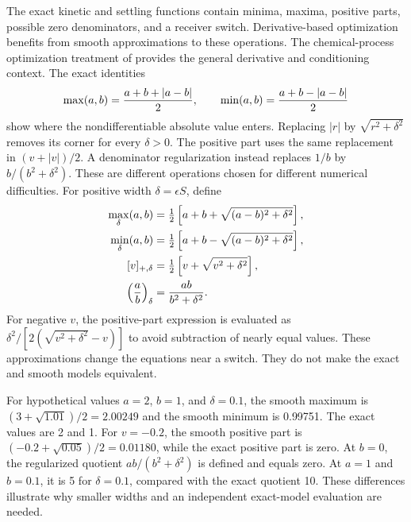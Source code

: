 The exact kinetic and settling functions contain minima, maxima, positive parts, possible zero denominators, and a receiver switch. Derivative-based optimization benefits from smooth approximations to these operations. The chemical-process optimization treatment of \citet{BuzziFerraris2013} provides the general derivative and conditioning context. The exact identities
\begin{equation}
\equationname{Exact maximum and minimum expressed through absolute values}
\max(a,b)=\frac{a+b+|a-b|}{2},\qquad
\min(a,b)=\frac{a+b-|a-b|}{2}
\end{equation}
show where the nondifferentiable absolute value enters. Replacing $|r|$ by $\sqrt{r^2+\delta^2}$ removes its corner for every $\delta>0$. The positive part uses the same replacement in $(v+|v|)/2$. A denominator regularization instead replaces $1/b$ by $b/(b^2+\delta^2)$. These are different operations chosen for different numerical difficulties. For positive width $\delta=\epsilon S$, define
\begin{align}
\equationname{Smooth approximation of a maximum}
\max_\delta(a,b)&=\tfrac12\left[a+b+\sqrt{(a-b)^2+\delta^2}\right],\\
\equationname{Smooth approximation of a minimum}
\min_\delta(a,b)&=\tfrac12\left[a+b-\sqrt{(a-b)^2+\delta^2}\right],\\
\equationname{Smooth approximation of the positive-part function}
[v]_{+,\delta}&=\tfrac12\left[v+\sqrt{v^2+\delta^2}\right],\\
\equationname{Regularized smooth approximation of a quotient}
\left(\frac ab\right)_\delta&=\frac{ab}{b^2+\delta^2}.
\label{eq:plant_smooth_operations}
\end{align}
For negative $v$, the positive-part expression is evaluated as $\delta^2/[2(\sqrt{v^2+\delta^2}-v)]$ to avoid subtraction of nearly equal values. These approximations change the equations near a switch. They do not make the exact and smooth models equivalent.

For hypothetical values $a=2$, $b=1$, and $\delta=0.1$, the smooth maximum is $(3+\sqrt{1.01})/2=2.00249$ and the smooth minimum is 0.99751. The exact values are 2 and 1. For $v=-0.2$, the smooth positive part is $(-0.2+\sqrt{0.05})/2=0.01180$, while the exact positive part is zero. At $b=0$, the regularized quotient $ab/(b^2+\delta^2)$ is defined and equals zero. At $a=1$ and $b=0.1$, it is 5 for $\delta=0.1$, compared with the exact quotient 10. These differences illustrate why smaller widths and an independent exact-model evaluation are needed.


